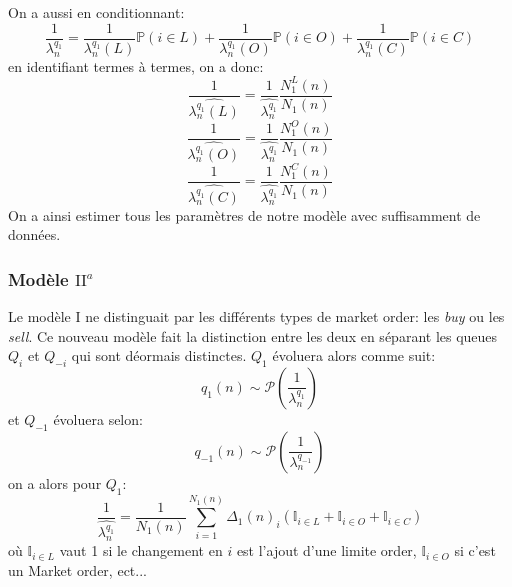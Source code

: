 \documentclass[12pt,a4paper]{article}
\theoremstyle{definition}
\theoremstyle{remark}
\begin{document}
    On a aussi en conditionnant:
    $$\frac{1}{{\lambda^{q_1}_n}}=\frac{1}{{\lambda^{q_1}_n(L)}}\mathbb{P}(i\in L)+\frac{1}{{\lambda^{q_1}_n(O)}}\mathbb{P}(i\in O)+\frac{1}{{\lambda^{q_1}_n(C)}}\mathbb{P}(i\in C)$$
    en identifiant termes à termes, on a donc:
    $$\frac{1}{\hat{\lambda^{q_1}_n(L)}}=\frac{1}{\hat{\lambda^{q_1}_n}}\frac{N_1^L(n)}{N_1(n)}$$
    $$\frac{1}{\hat{\lambda^{q_1}_n(O)}}=\frac{1}{\hat{\lambda^{q_1}_n}}\frac{N_1^O(n)}{N_1(n)}$$
    $$\frac{1}{\hat{\lambda^{q_1}_n(C)}}=\frac{1}{\hat{\lambda^{q_1}_n}}\frac{N_1^C(n)}{N_1(n)}$$
    On a ainsi estimer tous les paramètres de notre modèle avec suffisamment de données.

    \subsubsection{Modèle $\text{II}^{a}$}

    Le modèle I ne distinguait par les différents types de market order: les \textit{buy} ou les \textit{sell}. Ce nouveau modèle fait la distinction entre les deux en séparant les queues $Q_i$ et $Q_{-i}$ qui sont déormais distinctes. $Q_1$ évoluera alors comme suit:
    $$q_1(n)\sim\mathcal{P}(\frac{1}{\lambda^{q_1}_n})$$
    et $Q_{-1}$ évoluera selon:
    $$q_{-1}(n)\sim\mathcal{P}(\frac{1}{\lambda^{q_{-1}}_n})$$
    on a alors pour $Q_1$:
    $$\frac{1}{\hat{\lambda^{q_1}_n}} = \frac{1}{N_1(n)}\sum_{i=1}^{N_1(n)}\Delta_1(n)_i(\mathbb{I}_{i\in L}+\mathbb{I}_{i\in O}+\mathbb{I}_{i\in C})$$
    où $\mathbb{I}_{i\in L}$ vaut 1 si le changement en $i$ est l'ajout d'une limite order, $\mathbb{I}_{i\in O}$ si c'est un Market order, ect...
\end{document}
